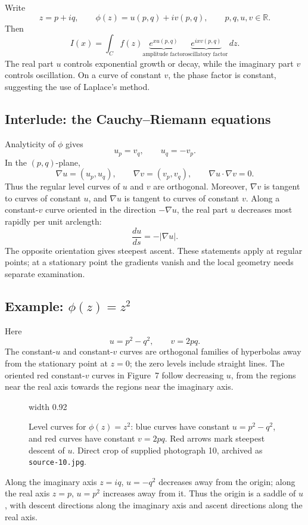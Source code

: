 \documentclass[11pt,a4paper]{article}
\begin{document}
Write
\[
    z=p+iq,\qquad\phi(z)=u(p,q)+iv(p,q),\qquad p,q,u,v\in\mathbb R.
\]
Then
\[
    I(x)=\int_C f(z)\underbrace{e^{xu(p,q)}}_{\text{amplitude factor}}
    \underbrace{e^{ixv(p,q)}}_{\text{oscillatory factor}}\,dz.
\]
The real part $u$ controls exponential growth or decay, while the
imaginary part $v$ controls oscillation. On a curve of constant $v$,
the phase factor is constant, suggesting the use of Laplace's method.

\subsection*{Interlude: the Cauchy--Riemann equations}
Analyticity of $\phi$ gives
\[
    u_p=v_q,\qquad u_q=-v_p.
\]
In the $(p,q)$-plane,
\[
    \nabla u=(u_p,u_q),\qquad\nabla v=(v_p,v_q),\qquad
    \nabla u\cdot\nabla v=0.
\]
Thus the regular level curves of $u$ and $v$ are orthogonal.
Moreover, $\nabla v$ is tangent to curves of constant $u$, and
$\nabla u$ is tangent to curves of constant $v$.
Along a constant-$v$ curve oriented in the direction $-\nabla u$,
the real part $u$ decreases most rapidly per unit arclength:
\[
    \frac{du}{ds}=-|\nabla u|.
\]
The opposite orientation gives steepest ascent. These statements apply
at regular points; at a stationary point the gradients vanish and the
local geometry needs separate examination.

\subsection*{Example: $\phi(z)=z^2$}
Here
\[
    u=p^2-q^2,\qquad v=2pq.
\]
The constant-$u$ and constant-$v$ curves are orthogonal families of
hyperbolas away from the stationary point at $z=0$; the zero levels
include straight lines. The oriented red constant-$v$ curves in
Figure~7 follow decreasing $u$, from the
regions near the real axis towards the regions near the imaginary axis.
\clearpage
\begin{figure}[!ht]
    \centering
    \pdfximage width 0.92\linewidth {figures/asymptotic-lecture8/steepest-descent.jpg}
    \pdfrefximage\pdflastximage
    \caption{Level curves for $\phi(z)=z^2$: blue curves have constant
    $u=p^2-q^2$, and red curves have constant $v=2pq$. Red arrows mark
    steepest descent of $u$. Direct crop of supplied photograph 10,
    archived as \texttt{source-10.jpg}.}
    \label{fig:am-lecture8-descent}
\end{figure}
Along the imaginary axis $z=iq$, $u=-q^2$ decreases away from the origin;
along the real axis $z=p$, $u=p^2$ increases away from it. Thus the
origin is a saddle of $u$, with descent directions along the imaginary
axis and ascent directions along the real axis.
\end{document}
